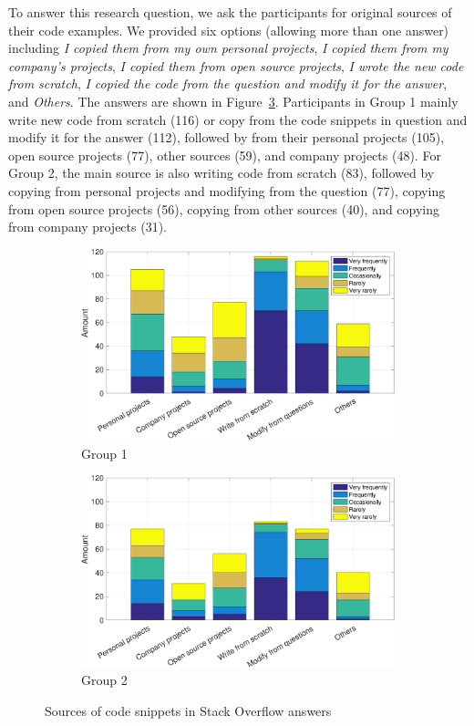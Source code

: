 \documentclass{svjour3}                     %
\begin{document}
To answer this research question, we ask the participants for original sources
of their code examples. We provided six options (allowing more than one answer)
including \textit{I copied them from my own personal projects}, \textit{I copied
	them from my company's projects}, \textit{I copied them from open source
	projects}, \textit{I wrote the new code from scratch}, \textit{I copied the code
	from the question and modify it for the answer}, and \textit{Others}. The
answers are shown in Figure~\ref{fig:survey_snippet_source}. Participants in
Group 1 mainly write new code from scratch (116) or copy from the code snippets
in question and modify it for the answer (112), followed by from their personal
projects (105), open source projects (77), other sources (59), and company
projects (48). For Group 2, the main source is also writing code from scratch
(83), followed by copying from personal projects and modifying from the question
(77), copying from open source projects (56), copying from other sources (40),
and copying from company projects (31).

\begin{figure}
	\begin{subfigure}{.5\textwidth}
		\centering
		\includegraphics[width=.9\linewidth]{survey_snippet_source_1}
		\caption{Group 1}
		\label{fig:survey_snippet_source_1}
	\end{subfigure}%
	\begin{subfigure}{.5\textwidth}
		\centering
		\includegraphics[width=.9\linewidth]{survey_snippet_source_2}
		\caption{Group 2}
		\label{fig:survey_snippet_source_2}
	\end{subfigure}
	\caption{Sources of code snippets in Stack Overflow answers}
	\label{fig:survey_snippet_source}
\end{figure}
\end{document}
